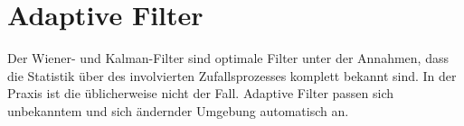 



\chapter{Adaptive Filter}
Der Wiener- und Kalman-Filter sind optimale Filter unter der Annahmen, 
dass die Statistik über des involvierten Zufallsprozesses komplett
bekannt sind. In der Praxis ist die üblicherweise nicht der Fall. 
Adaptive Filter passen sich unbekanntem und sich ändernder Umgebung 
automatisch an.
